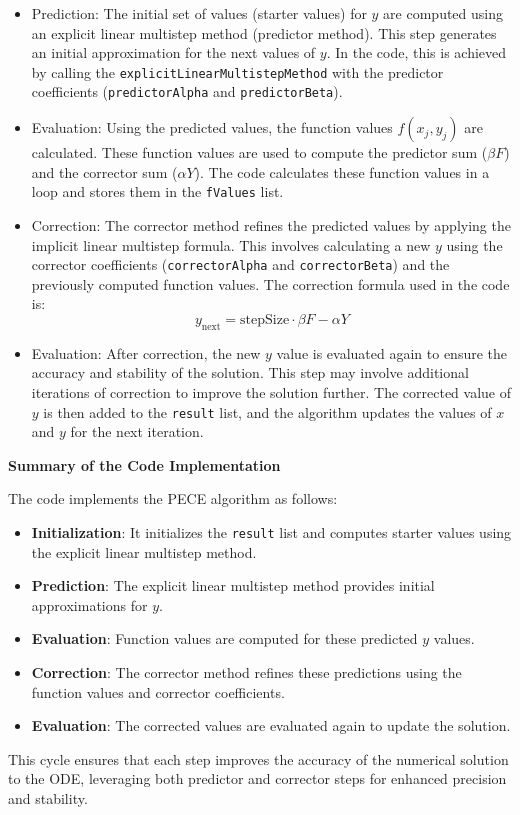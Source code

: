 \begin{itemize}
    \item Prediction: The initial set of values (starter values) for $y$ are computed using an explicit linear multistep method (predictor method). This step generates an initial approximation for the next values of $y$. In the code, this is achieved by calling the \texttt{explicitLinearMultistepMethod} with the predictor coefficients (\texttt{predictorAlpha} and \texttt{predictorBeta}).
    \item Evaluation: Using the predicted values, the function values $f(x_j, y_j)$ are calculated. These function values are used to compute the predictor sum ($\beta F$) and the corrector sum ($\alpha Y$). The code calculates these function values in a loop and stores them in the \texttt{fValues} list.
    \item Correction: The corrector method refines the predicted values by applying the implicit linear multistep formula. This involves calculating a new $y$ using the corrector coefficients (\texttt{correctorAlpha} and \texttt{correctorBeta}) and the previously computed function values. The correction formula used in the code is:
    \[
    y_{\text{next}} = \text{stepSize} \cdot \beta F - \alpha Y
    \]
    \item Evaluation: After correction, the new $y$ value is evaluated again to ensure the accuracy and stability of the solution. This step may involve additional iterations of correction to improve the solution further. The corrected value of $y$ is then added to the \texttt{result} list, and the algorithm updates the values of $x$ and $y$ for the next iteration.
\end{itemize}




\textbf{Summary of the Code Implementation}

The code implements the PECE algorithm as follows:

\begin{itemize}
    \item \textbf{Initialization}: It initializes the \texttt{result} list and computes starter values using the explicit linear multistep method.
    \item \textbf{Prediction}: The explicit linear multistep method provides initial approximations for $y$.
    \item \textbf{Evaluation}: Function values are computed for these predicted $y$ values.
    \item \textbf{Correction}: The corrector method refines these predictions using the function values and corrector coefficients.
    \item \textbf{Evaluation}: The corrected values are evaluated again to update the solution.
\end{itemize}

This cycle ensures that each step improves the accuracy of the numerical solution to the ODE, leveraging both predictor and corrector steps for enhanced precision and stability.
